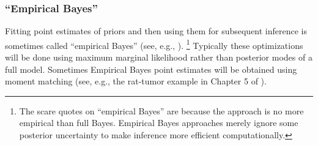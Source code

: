 \subsubsection{``Empirical Bayes''}

Fitting point estimates of priors and then using them for subsequent
inference is sometimes called ``empirical Bayes'' (see, e.g.,
\citep{Efron:2012}).%
%
\footnote{The scare quotes on ``empirical Bayes'' are because the
  approach is no more empirical than full Bayes.  Empirical Bayes
  approaches merely ignore some posterior uncertainty to make
  inference more efficient computationally.}
%
Typically these optimizations will be done using maximum marginal
likelihood rather than posterior modes of a full model.  Sometimes
Empirical Bayes point estimates will be obtained using moment matching
(see, e.g., the rat-tumor example in Chapter 5 of
\citep{GelmanEtAl:2013}).


